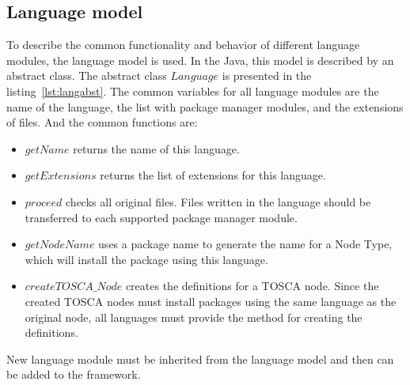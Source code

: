 \subsection*{Language model}
To describe the common functionality and behavior of different language modules, the language model is used. 
In the Java, this model is described by an abstract class. 
The abstract class $Language$ is presented in the listing~\ref{lst:langabst}.
The common variables for all language modules are the name of the language, the list with package manager modules, and the extensions of files.
And the common functions are: 
\begin{itemize}
	\item $getName$ returns the name of this language.
	\item $getExtensions$ returns the list of extensions for this language.
	\item $proceed$ checks all original files.  
	Files written in the language should be transferred to each supported package manager module.
	\item $getNodeName$ uses a package name to generate the name for a Node Type, which will install the package using this language.
	\item $createTOSCA\_Node$ creates the definitions for a TOSCA node. 
	Since the created TOSCA nodes must install packages using the same language as the original node, all languages must provide the method for creating the definitions.
\end{itemize}
New language module must be inherited from the language model and then can be added to the framework.

